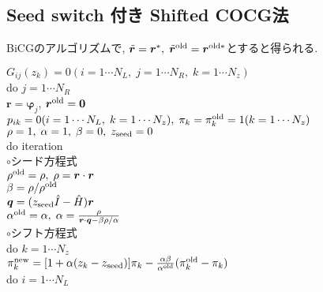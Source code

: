 \documentclass[12pt,titlepage]{jarticle}
\begin{document}
\subsection{Seed switch 付き Shifted COCG法}

BiCGのアルゴリズムで, ${\tilde {\boldsymbol r}} = {\boldsymbol r}^*,\; 
{\tilde {\boldsymbol r}}^{\rm old} = {\boldsymbol r}^{{\rm old}*}$とすると得られる.

\noindent
$G_{i j}(z_k) = 0 (i=1 \cdots N_L,\; j = 1 \cdots N_R,\; k=1 \cdots N_z)$
\\
do $j = 1 \cdots N_R$
\\\hspace{0.5cm}
${\boldsymbol r} = {\boldsymbol \varphi_j}$, 
${\boldsymbol r}^{\rm old} = {\bf 0}$
\\\hspace{0.5cm}
$p_{i k} = 0(i=1 \cdots N_L,\; k=1 \cdots N_z),\; \pi_k=\pi_k^{\rm old} = 1(k=1 \cdots N_z)$ 
\\\hspace{0.5cm}
$\rho = 1,\; \alpha = 1,\; \beta=0,\; z_{\rm seed}=0$ 
\\\hspace{0.5cm}
do iteration
\\\hspace{1.0cm}
$\circ$シード方程式
\\\hspace{1.0cm}
$\rho^{\rm old} = \rho,\; \rho = {\boldsymbol r} \cdot {\boldsymbol r}$
\\\hspace{1.0cm}
$\beta = \rho / \rho^{\rm old}$
\\\hspace{1.0cm}
${\boldsymbol q} = (z_{\rm seed} {\hat I} - {\hat H}){\boldsymbol r}$
\\\hspace{1.0cm}
$\alpha^{\rm old} = \alpha,\; 
\alpha = \frac{\rho}{{\boldsymbol r}\cdot{\boldsymbol q} - \beta \rho / \alpha }$
\\\hspace{1.0cm}
$\circ$シフト方程式
\\\hspace{1.0cm}
do $k = 1 \cdots N_z$
\\\hspace{1.5cm}
$\pi_k^{\rm new} = [1+\alpha(z_k-z_{\rm seed})]\pi_k - \frac{\alpha \beta}{\alpha^{\rm old}}(\pi_k^{\rm old} - \pi_k)$
\\\hspace{1.5cm}
do $i = 1 \cdots N_L$
\\\hspace{2.0cm}
\end{document}
